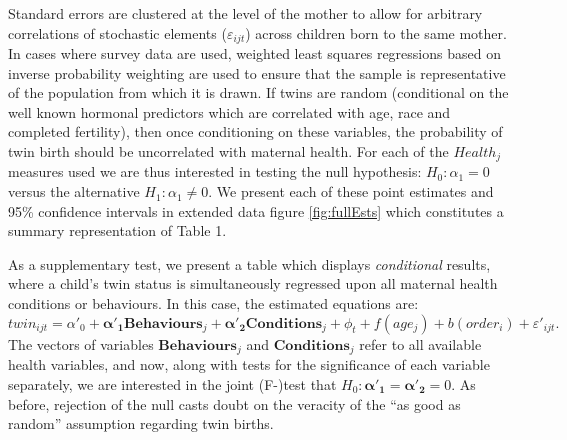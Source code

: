 \documentclass{nature}
\begin{document}
\begin{linenumbers}
Standard errors are clustered at the level of the mother to allow for arbitrary correlations of stochastic elements ($\varepsilon_{ijt}$) across children born to the same mother. In cases where survey data are used, weighted least squares regressions based on inverse probability weighting are used to ensure that the sample is representative of the population from which it is drawn. If twins are random (conditional on the well known  hormonal predictors which are correlated with age, race and completed fertility\cite{Hall2003}), then once conditioning on these variables, the probability of twin birth should be uncorrelated with maternal health. For each of the $Health_j$ measures used we are thus interested in testing the null hypothesis: $H_0: \alpha_1=0$ versus the alternative $H_1: \alpha_1\neq0$.  We present each of these point estimates and 95\% confidence intervals in extended data figure \ref{fig:fullEsts} which constitutes a summary representation of Table 1. %

As a supplementary test, we present a table which displays \emph{conditional} results, where a child's twin status is simultaneously regressed upon all maternal health conditions or behaviours.  In this case, the estimated equations are:
\begin{equation}
  \label{reg:twincond}
  twin_{ijt}=\alpha'_0 + \bm{\alpha'_1} \bm{Behaviours}_j + \bm{\alpha'_2} \bm{Conditions}_j + \phi_t + f(age_j) + b(order_i) + \varepsilon'_{ijt}.
\end{equation}
The vectors of variables $\bm{Behaviours}_j$ and $\bm{Conditions}_j$ refer to all available health variables, and now, along with tests for the significance of each variable separately, we are interested in the joint (F-)test that $H_0:\bm{\alpha'_1}=\bm{\alpha'_2}=0$.  As before, rejection of the null casts doubt on the veracity of the ``as good as random'' assumption regarding twin births.



\end{linenumbers}
\end{document}
